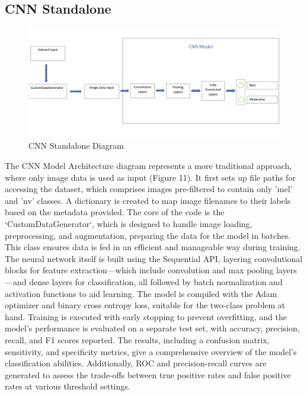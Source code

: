 \documentclass[10pt,twocolumn]{article}
\begin{document}
\subsection{CNN Standalone}
\begin{figure}[h]
\caption{CNN Standalone Diagram}
\includegraphics[scale=0.35]{CNN Model Architecture.png}\newline
\end{figure}

The CNN Model Architecture diagram represents a more traditional approach, where only image data is used as input (Figure 11).
\newline
It first sets up file paths for accessing the dataset, which comprises images pre-filtered to contain only 'mel' and 'nv' classes. A dictionary is created to map image filenames to their labels based on the metadata provided.
\newline
The core of the code is the `CustomDataGenerator`, which is designed to handle image loading, preprocessing, and augmentation, preparing the data for the model in batches. This class ensures data is fed in an efficient and manageable way during training.
\newline
The neural network itself is built using the Sequential API, layering convolutional blocks for feature extraction—which include convolution and max pooling layers—and dense layers for classification, all followed by batch normalization and activation functions to aid learning. The model is compiled with the Adam optimizer and binary cross entropy loss, suitable for the two-class problem at hand.
\newline
Training is executed with early stopping to prevent overfitting, and the model's performance is evaluated on a separate test set, with accuracy, precision, recall, and F1 scores reported. The results, including a confusion matrix, sensitivity, and specificity metrics, give a comprehensive overview of the model's classification abilities. Additionally, ROC and precision-recall curves are generated to assess the trade-offs between true positive rates and false positive rates at various threshold settings.
\end{document}
